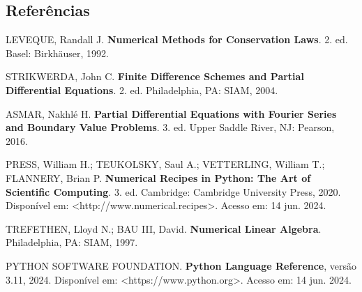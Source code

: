 \begin{titlepage}

    \section{Referências}

    \vspace{0.5cm} %

    \noindent LEVEQUE, Randall J. \textbf{Numerical Methods for Conservation Laws}. 2. ed. Basel: Birkhäuser, 1992.

    \noindent STRIKWERDA, John C. \textbf{Finite Difference Schemes and Partial Differential Equations}. 2. ed. Philadelphia, PA: SIAM, 2004.

    \noindent ASMAR, Nakhlé H. \textbf{Partial Differential Equations with Fourier Series and Boundary Value Problems}. 3. ed. Upper Saddle River, NJ: Pearson, 2016.

    \noindent PRESS, William H.; TEUKOLSKY, Saul A.; VETTERLING, William T.; FLANNERY, Brian P. \textbf{Numerical Recipes in Python: The Art of Scientific Computing}. 3. ed. Cambridge: Cambridge University Press, 2020. Disponível em: <http://www.numerical.recipes>. Acesso em: 14 jun. 2024.

    \noindent TREFETHEN, Lloyd N.; BAU III, David. \textbf{Numerical Linear Algebra}. Philadelphia, PA: SIAM, 1997.

    \noindent PYTHON SOFTWARE FOUNDATION. \textbf{Python Language Reference}, versão 3.11, 2024. Disponível em: <https://www.python.org>. Acesso em: 14 jun. 2024.

\end{titlepage}
